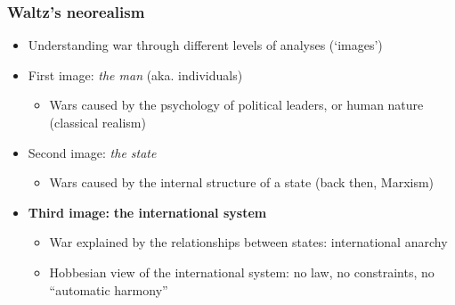 \documentclass[aspectratio=43]{beamer}
\begin{document}
\begin{frame}
\frametitle{Waltz's neorealism}
\centering


\begin{minipage}{0.71\textwidth}\centering
\begin{itemize}[<+->]
\item Understanding war through different levels of analyses (`images')
\item First image: \textit{the man} (aka. individuals)
  \begin{itemize}
  \item Wars caused by the psychology of political leaders, or human nature (classical realism)
  \end{itemize}
\item Second image: \textit{the state}
  \begin{itemize}
  \item Wars caused by the internal structure of a state (back then, Marxism)
  \end{itemize}
\item \textbf{Third image:} \textbf{the international system}
  \begin{itemize}
  \item War explained by the relationships between states: international anarchy
  \item Hobbesian view of the international system: no law, no constraints, no ``automatic harmony''
  \end{itemize}
\end{itemize}
\end{minipage}\hfill
\begin{minipage}{0.28\textwidth}\centering

\end{minipage}
\end{frame}
\end{document}
